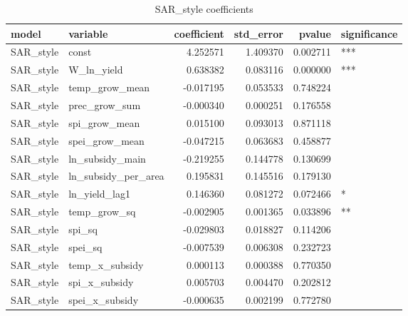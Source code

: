 \begin{table}
\caption{SAR_style coefficients}
\label{tab:SAR_style_coef}
\begin{tabular}{llrrrl}
\toprule
model & variable & coefficient & std_error & pvalue & significance \\
\midrule
SAR_style & const & 4.252571 & 1.409370 & 0.002711 & *** \\
SAR_style & W_ln_yield & 0.638382 & 0.083116 & 0.000000 & *** \\
SAR_style & temp_grow_mean & -0.017195 & 0.053533 & 0.748224 &  \\
SAR_style & prec_grow_sum & -0.000340 & 0.000251 & 0.176558 &  \\
SAR_style & spi_grow_mean & 0.015100 & 0.093013 & 0.871118 &  \\
SAR_style & spei_grow_mean & -0.047215 & 0.063683 & 0.458877 &  \\
SAR_style & ln_subsidy_main & -0.219255 & 0.144778 & 0.130699 &  \\
SAR_style & ln_subsidy_per_area & 0.195831 & 0.145516 & 0.179130 &  \\
SAR_style & ln_yield_lag1 & 0.146360 & 0.081272 & 0.072466 & * \\
SAR_style & temp_grow_sq & -0.002905 & 0.001365 & 0.033896 & ** \\
SAR_style & spi_sq & -0.029803 & 0.018827 & 0.114206 &  \\
SAR_style & spei_sq & -0.007539 & 0.006308 & 0.232723 &  \\
SAR_style & temp_x_subsidy & 0.000113 & 0.000388 & 0.770350 &  \\
SAR_style & spi_x_subsidy & 0.005703 & 0.004470 & 0.202812 &  \\
SAR_style & spei_x_subsidy & -0.000635 & 0.002199 & 0.772780 &  \\
\bottomrule
\end{tabular}
\end{table}
